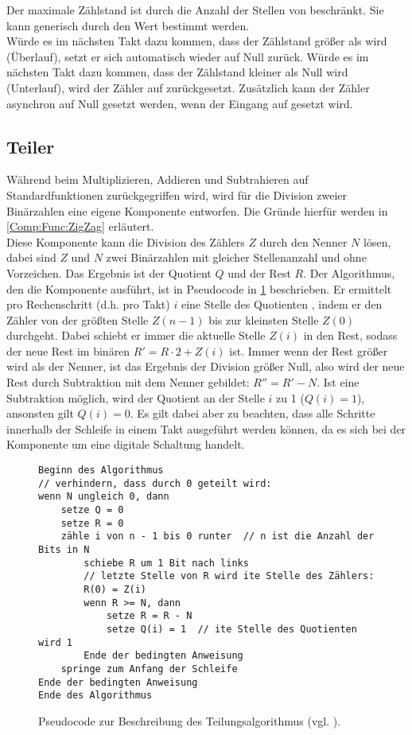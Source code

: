 Der maximale Zählstand ist durch die Anzahl der Stellen von  beschränkt. Sie kann generisch durch den Wert  bestimmt werden. \\
Würde es im nächsten Takt dazu kommen, dass der Zählstand größer als  wird (Überlauf), setzt er sich automatisch wieder auf Null zurück.
Würde es im nächsten Takt dazu kommen, dass der Zählstand kleiner als Null wird (Unterlauf), wird der Zähler auf  zurückgesetzt.
Zusätzlich kann der Zähler asynchron auf Null gesetzt werden, wenn der Eingang  auf  gesetzt wird.


\subsection{Teiler} \label{Comp:Arith:Division}
Während beim Multiplizieren, Addieren und Subtrahieren auf Standardfunktionen
zurückgegriffen wird, wird für die Division zweier Binärzahlen eine eigene
Komponente entworfen. Die Gründe hierfür werden in \cref{Comp:Func:ZigZag}
erläutert. \\ 
Diese Komponente kann die Division des Zählers $Z$ durch den Nenner $N$
lösen, dabei sind $Z$ und $N$ zwei Binärzahlen mit gleicher
Stellenanzahl und ohne Vorzeichen. Das Ergebnis ist der Quotient $Q$ und der Rest $R$. Der Algorithmus, den die Komponente ausführt, ist in Pseudocode in \cref{Comp:Arith:Division:Pseudo} beschrieben.
Er ermittelt pro Rechenschritt (d.h. pro Takt) $i$ eine Stelle des Quotienten , indem er den Zähler von der größten Stelle $Z(n-1)$ bis zur kleinsten Stelle $Z(0)$ durchgeht.
Dabei schiebt er immer die aktuelle Stelle $Z(i)$ in den Rest, sodass der neue Rest im binären $R' = R \cdot 2 + Z(i)$ ist.
Immer wenn der Rest größer wird als der Nenner, ist das Ergebnis der Division größer Null, also wird der neue Rest durch Subtraktion mit dem Nenner gebildet: $R'' = R' - N$.
Ist eine Subtraktion möglich, wird der Quotient an der Stelle $i$ zu 1 ($Q(i)=1$), ansonsten gilt $Q(i)=0$.
Es gilt dabei aber zu beachten, dass alle Schritte innerhalb der Schleife in einem Takt ausgeführt werden können, da es sich bei der Komponente um eine digitale Schaltung handelt.

\begin{figure}
\begin{verbatim}
Beginn des Algorithmus
// verhindern, dass durch 0 geteilt wird:
wenn N ungleich 0, dann
    setze Q = 0
    setze R = 0
    zähle i von n - 1 bis 0 runter  // n ist die Anzahl der Bits in N
        schiebe R um 1 Bit nach links
        // letzte Stelle von R wird ite Stelle des Zählers:
        R(0) = Z(i)                    
        wenn R >= N, dann               
            setze R = R - N
            setze Q(i) = 1  // ite Stelle des Quotienten wird 1 
        Ende der bedingten Anweisung
    springe zum Anfang der Schleife
Ende der bedingten Anweisung
Ende des Algorithmus
\end{verbatim}
\caption{Pseudocode zur Beschreibung des Teilungsalgorithmus (vgl. \cite{wikipedia2022}).} \label{Comp:Arith:Division:Pseudo}
\end{figure}

